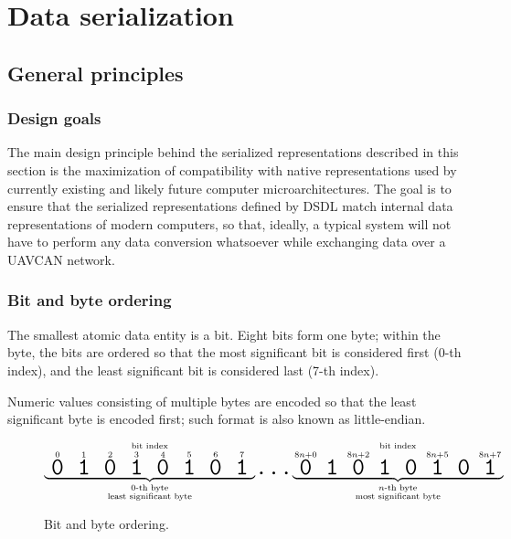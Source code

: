 \section{Data serialization}\label{sec:dsdl_data_serialization}

\newcommand{\hugett}[1]{\texttt{\huge{#1}}}

\subsection{General principles}

\subsubsection{Design goals}

The main design principle behind the serialized representations described in this section is
the maximization of compatibility with native representations used by currently existing and
likely future computer microarchitectures.
The goal is to ensure that the serialized representations defined by DSDL match internal data representations of
modern computers, so that, ideally, a typical system will not have to perform any data conversion whatsoever while
exchanging data over a UAVCAN network.

\subsubsection{Bit and byte ordering}

The smallest atomic data entity is a bit.
Eight bits form one byte;
within the byte, the bits are ordered so that the most significant bit is considered first (0-th index),
and the least significant bit is considered last (7-th index).

Numeric values consisting of multiple bytes are encoded so that the least significant byte is encoded first;
such format is also known as little-endian.

\begin{figure}[H]
    $$
    \overset{\text{bit index}}{%
        \underbrace{%
            \overset{0}{\hugett{\;0\;}}
            \overset{1}{\hugett{\;1\;}}
            \overset{2}{\hugett{\;0\;}}
            \overset{3}{\hugett{\;1\;}}
            \overset{4}{\hugett{\;0\;}}
            \overset{5}{\hugett{\;1\;}}
            \overset{6}{\hugett{\;0\;}}
            \overset{7}{\hugett{\;1\;}}
        }_{\substack{\text{0-th byte} \\ \text{least significant byte}}}%
    }
    \hugett{\ldots}
    \overset{\text{bit index}}{%
        \underbrace{%
            \overset{8n+0}{\hugett{\;0\;}}
                          {\hugett{\;1\;}}
            \overset{8n+2}{\hugett{\;0\;}}
                          {\hugett{\;1\;}}
                          {\hugett{\;0\;}}
            \overset{8n+5}{\hugett{\;1\;}}
                          {\hugett{\;0\;}}
            \overset{8n+7}{\hugett{\;1\;}}
        }_{\substack{n\text{-th byte} \\ \text{most significant byte}}}%
    }
    $$
    \caption{Bit and byte ordering.\label{fig:dsdl_serialization_bit_ordering}}
\end{figure}

